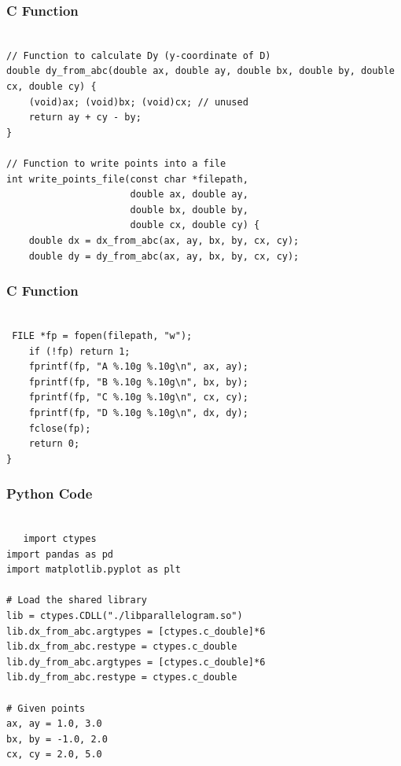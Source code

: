 \documentclass{beamer}
\begin{document}
\begin{frame}[fragile]
\frametitle{C Function}
     \begin{lstlisting}

// Function to calculate Dy (y-coordinate of D)
double dy_from_abc(double ax, double ay, double bx, double by, double cx, double cy) {
    (void)ax; (void)bx; (void)cx; // unused
    return ay + cy - by;
}

// Function to write points into a file
int write_points_file(const char *filepath,
                      double ax, double ay,
                      double bx, double by,
                      double cx, double cy) {
    double dx = dx_from_abc(ax, ay, bx, by, cx, cy);
    double dy = dy_from_abc(ax, ay, bx, by, cx, cy);
     \end{lstlisting}
     \end{frame}

\begin{frame}[fragile]
\frametitle{C Function}
   \begin{lstlisting}

 FILE *fp = fopen(filepath, "w");
    if (!fp) return 1;
    fprintf(fp, "A %.10g %.10g\n", ax, ay);
    fprintf(fp, "B %.10g %.10g\n", bx, by);
    fprintf(fp, "C %.10g %.10g\n", cx, cy);
    fprintf(fp, "D %.10g %.10g\n", dx, dy);
    fclose(fp);
    return 0;
}

   \end{lstlisting}
\end{frame}

\begin{frame}[fragile]
\frametitle{Python Code}
   \begin{lstlisting}

   import ctypes
import pandas as pd
import matplotlib.pyplot as plt

# Load the shared library
lib = ctypes.CDLL("./libparallelogram.so")
lib.dx_from_abc.argtypes = [ctypes.c_double]*6
lib.dx_from_abc.restype = ctypes.c_double
lib.dy_from_abc.argtypes = [ctypes.c_double]*6
lib.dy_from_abc.restype = ctypes.c_double

# Given points
ax, ay = 1.0, 3.0
bx, by = -1.0, 2.0
cx, cy = 2.0, 5.0

\end{lstlisting}
\end{frame}
\end{document}
